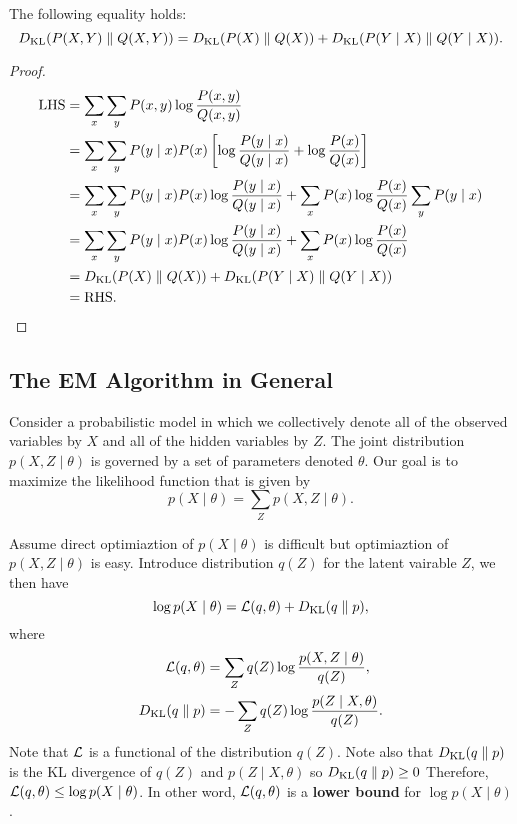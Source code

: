 \documentclass[a4paper]{article}
\begin{document}
\begin{thm}
The following equality holds:
\[
D_\text{KL}({P(X, Y)} \; \Vert \; {Q(X, Y)}) =
D_\text{KL}({P(X)} \; \Vert \; {Q(X)}) + D_\text{KL}({P(Y \mid X)}
\; \Vert \; {Q(Y \mid X)}).
\]
\end{thm}

\begin{proof}
\[
\begin{aligned}
  \text{LHS} &= \sum_x \sum_y P(x,y) \log \frac{P(x,y)}{Q(x,y)} \\
  &= \sum_x \sum_y P(y \mid x) P(x) \left[ \log
  \frac{P(y \mid x)}{Q(y \mid x)} + \log \frac{P(x)}{Q(x)} \right] \\
  &= \sum_x \sum_y P(y \mid x) P(x) \log
  \frac{P(y \mid x)}{Q(y \mid x)} + \sum_x P(x) \log
  \frac{P(x)}{Q(x)} \sum_y P(y \mid x) \\
  &= \sum_x \sum_y P(y \mid x) P(x) \log \frac{P(y \mid x)}
  {Q(y \mid x)} + \sum_x P(x) \log \frac{P(x)}{Q(x)} \\
  &= D_\text{KL}({P(X)} \; \Vert \; {Q(X)}) + D_\text{KL}({P(Y \mid X)} \; \Vert \; {Q(Y \mid X)}) \\
  &= \text{RHS}.
\end{aligned}
\]
\end{proof}

\subsection{The EM Algorithm in General}

Consider a probabilistic model in which we collectively
denote all of the observed variables by $X$ and all of
the hidden variables by $Z$. The joint distribution
$p(X, Z \mid \theta)$ is governed by a set of parameters
denoted $\theta$. Our goal is to maximize the likelihood
function that is given by
\[
p(X \mid \theta) = \sum_Z p(X, Z \mid \theta).
\]

Assume direct optimiaztion of $p(X \mid \theta)$ is difficult
but optimiaztion of $p(X, Z \mid \theta)$ is easy.
Introduce distribution $q(Z)$ for the latent vairable $Z$,
we then have
\[
\log p(X \mid \theta) = \mathcal{L}(q, \theta) + D_{\text{KL}}(q \; \Vert \; p),
\]
where
\[
\begin{aligned}
  \mathcal{L}(q, \theta) &= \sum_Z q(Z) \log \frac{p(X, Z \mid \theta)}{q(Z)}, \\
  D_{\text{KL}}(q \; \Vert \; p) &= - \sum_Z q(Z) \log \frac{p(Z \mid X, \theta)}{q(Z)}.
\end{aligned}
\]
Note that $\mathcal{L}$ is a functional of the distribution $q(Z)$.
Note also that $D_{\text{KL}}(q \; \Vert \; p)$ is the KL divergence of $q(Z)$
and $p(Z \mid X, \theta)$ so $D_{\text{KL}}(q \; \Vert \; p) \geq 0$
Therefore, $\mathcal{L}(q, \theta) \leq \log p(X \mid \theta)$. In other word,
$\mathcal{L}(q, \theta)$ is a \textbf{lower bound}
for $\log p(X \mid \theta)$.
\end{document}
